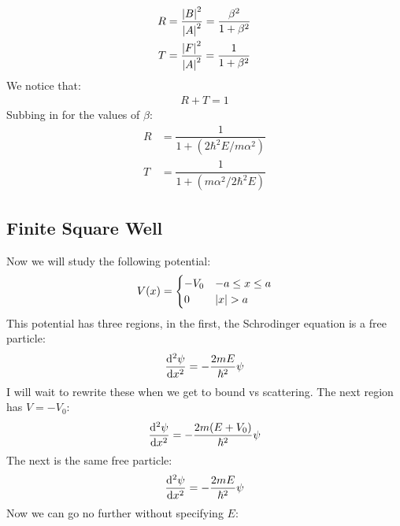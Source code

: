 \begin{align*}
  R&=\dfrac{\abs{B}^2}{\abs{A}^2}=\dfrac{\beta^2}{1+\beta^2} \\
  T&=\dfrac{\abs{F}^2}{\abs{A}^2}=\dfrac{1}{1+\beta^2}
\end{align*}
We notice that:
\begin{align*}
  R+T=1
\end{align*}
Subbing in for the values of $\beta$:
\begin{align*}
  R&=\dfrac{1}{1+(2\hbar^2E/m\alpha^2)} \\
  T&=\dfrac{1}{1+(m\alpha^2/2\hbar^2E)}
\end{align*}
\subsection{Finite Square Well}
Now we will study the following potential:
\begin{align*}
  V(x)=
  \begin{cases}
    -V_0 & -a \leq x \leq a \\
    0 & \abs{x} > a
  \end{cases}
\end{align*}
This potential has three regions, in the first, the Schrodinger equation is a free particle:
\begin{align*}
  \dv[2]{\psi}{x}=-\dfrac{2mE}{\hbar^2}\psi
\end{align*}
I will wait to rewrite these when we get to bound vs scattering. The next region has $V=-V_0$:
\begin{align*}
  \dv[2]{\psi}{x}=-\dfrac{2m(E+V_0)}{\hbar^2}\psi
\end{align*}
The next is the same free particle:
\begin{align*}
  \dv[2]{\psi}{x}=-\dfrac{2mE}{\hbar^2}\psi
\end{align*}
Now we can go no further without specifying $E$:
